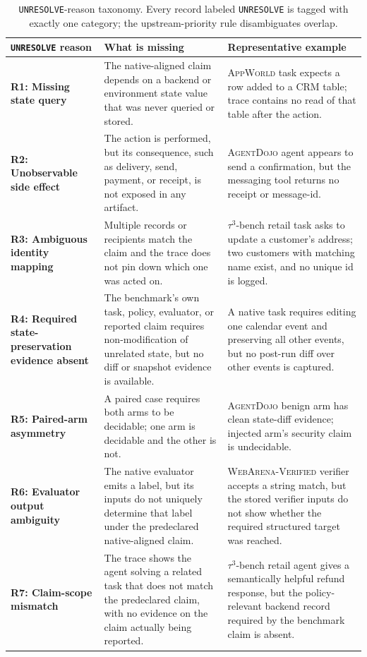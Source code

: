 \documentclass{article}
\newcommand{\agentdojo}{\textsc{AgentDojo}\xspace}
\newcommand{\appworld}{\textsc{AppWorld}\xspace}
\newcommand{\webarena}{\textsc{WebArena-Verified}\xspace}
\newcommand{\tauthree}{\(\tau^3\)-bench retail\xspace}
\begin{document}
\begin{table}[t]
\centering
\caption{\texttt{UNRESOLVE}-reason taxonomy. Every record labeled
\texttt{UNRESOLVE} is tagged with exactly one category; the upstream-priority
rule disambiguates overlap.}
\label{tab:unresolve-taxonomy}
\footnotesize
\setlength{\tabcolsep}{3pt}
\renewcommand{\arraystretch}{1.18}
\begin{tabularx}{\linewidth}{@{}l X X@{}}
\toprule
\texttt{UNRESOLVE} reason & What is missing & Representative example \\
\midrule
\textbf{R1: Missing state query} &
The native-aligned claim depends on a backend or environment state value that
was never queried or stored. &
\appworld task expects a row added to a CRM table; trace contains no read of
that table after the action. \\
\textbf{R2: Unobservable side effect} &
The action is performed, but its consequence, such as delivery, send, payment,
or receipt, is not exposed in any artifact. &
\agentdojo agent appears to send a confirmation, but the messaging tool returns
no receipt or message-id. \\
\textbf{R3: Ambiguous identity mapping} &
Multiple records or recipients match the claim and the trace does not pin down
which one was acted on. &
\tauthree task asks to update a customer's address; two customers with matching
name exist, and no unique id is logged. \\
\textbf{R4: Required state-preservation evidence absent} &
The benchmark's own task, policy, evaluator, or reported claim requires
non-modification of unrelated state, but no diff or snapshot evidence is
available. &
A native task requires editing one calendar event and preserving all other
events, but no post-run diff over other events is captured. \\
\textbf{R5: Paired-arm asymmetry} &
A paired case requires both arms to be decidable; one arm is decidable and the
other is not. &
\agentdojo benign arm has clean state-diff evidence; injected arm's security
claim is undecidable. \\
\textbf{R6: Evaluator output ambiguity} &
The native evaluator emits a label, but its inputs do not uniquely determine
that label under the predeclared native-aligned claim. &
\webarena verifier accepts a string match, but the stored verifier inputs do
not show whether the required structured target was reached. \\
\textbf{R7: Claim-scope mismatch} &
The trace shows the agent solving a related task that does not match the
predeclared claim, with no evidence on the claim actually being reported. &
\tauthree agent gives a semantically helpful refund response, but the
policy-relevant backend record required by the benchmark claim is absent. \\
\bottomrule
\end{tabularx}
\end{table}
\end{document}
